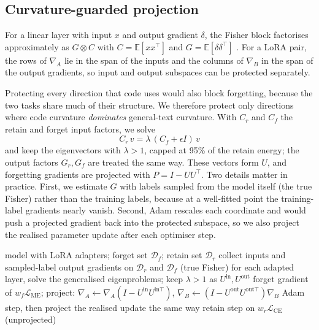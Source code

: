 \documentclass{article}
\newcommand{\Df}{\mathcal{D}_f}
\newcommand{\Dr}{\mathcal{D}_r}
\newcommand{\me}{\mathrm{ME}}
\begin{document}
\subsection{Curvature-guarded projection}
For a linear layer with input $x$ and output gradient $\delta$, the Fisher block factorises approximately as $G\otimes C$ with $C=\mathbb{E}[xx^\top]$ and $G=\mathbb{E}[\delta\delta^\top]$ \citep{martens2015kfac}. For a LoRA pair, the rows of $\nabla_A$ lie in the span of the inputs and the columns of $\nabla_B$ in the span of the output gradients, so input and output subspaces can be protected separately.

Protecting every direction that code uses would also block forgetting, because the two tasks share much of their structure. We therefore protect only directions where code curvature \emph{dominates} general-text curvature. With $C_r$ and $C_f$ the retain and forget input factors, we solve
\begin{equation}
C_r\,v = \lambda\,(C_f+\epsilon I)\,v
\end{equation}
and keep the eigenvectors with $\lambda>1$, capped at 95\% of the retain energy; the output factors $G_r, G_f$ are treated the same way. These vectors form $U$, and forgetting gradients are projected with $P=I-UU^\top$. Two details matter in practice. First, we estimate $G$ with labels sampled from the model itself (the true Fisher) rather than the training labels, because at a well-fitted point the training-label gradients nearly vanish. Second, Adam rescales each coordinate and would push a projected gradient back into the protected subspace, so we also project the realised parameter update after each optimiser step.

\begin{algorithm}[t]
\caption{CG-OSS}
\label{alg:cgoss}
\begin{algorithmic}[1]
\REQUIRE model with LoRA adapters; forget set $\Df$; retain set $\Dr$
\STATE collect inputs and sampled-label output gradients on $\Dr$ and $\Df$ (true Fisher)
\STATE for each adapted layer, solve the generalised eigenproblems; keep $\lambda>1$ as $U^{\mathrm{in}}, U^{\mathrm{out}}$
  \STATE forget gradient of $w_f\mathcal{L}_{\me}$; project: $\nabla_A\leftarrow\nabla_A(I-U^{\mathrm{in}}U^{\mathrm{in}\top})$, $\nabla_B\leftarrow(I-U^{\mathrm{out}}U^{\mathrm{out}\top})\nabla_B$
  \STATE Adam step, then project the realised update the same way
  \STATE retain step on $w_r\mathcal{L}_{\mathrm{CE}}$ (unprojected)
\ENDFOR
\end{algorithmic}
\end{algorithm}
\end{document}
